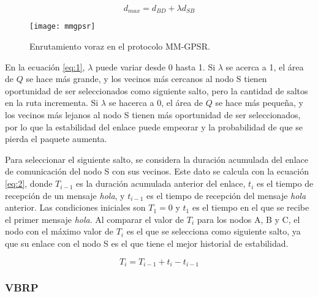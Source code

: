 \begin{equation}
\label{eq:1}
d_{max} = d_{BD} + \lambda d_{SB}
\end{equation}

\begin{figure}[th]
\centering
\texttt{[image: mmgpsr]}
\decoRule
\caption[Enrutamiento voraz en el protocolo MM-GPSR]{Enrutamiento voraz en el
protocolo MM-GPSR\protect\footnotemark.}
\label{fig:mmgpsr}
\end{figure}


En la ecuación \ref{eq:1}, $\lambda$ puede variar desde 0 hasta 1. Si $\lambda$ se
acerca a 1, el área de $Q$ se hace más grande, y los vecinos más cercanos al nodo S
tienen oportunidad de ser seleccionados como siguiente salto, pero la cantidad
de saltos en la ruta incrementa. Si $\lambda$ se hacerca a 0, el área de $Q$ se
hace más pequeña, y los vecinos más lejanos al nodo S tienen más oportunidad
de ser seleccionados, por lo que la estabilidad del enlace puede empeorar
y la probabilidad de que se pierda el paquete aumenta.

Para seleccionar el siguiente salto, se considera la duración acumulada del
enlace de comunicación del nodo S con sus vecinos. Este dato se calcula con la
ecuación \ref{eq:2}, donde $T_{i-1}$ es la duración acumulada anterior del
enlace, $t_i$ es el tiempo de recepción de un mensaje \textit{hola}, y $t_{i-1}$
es el tiempo de recepción del mensaje \textit{hola} anterior. Las condiciones
iniciales son $T_1 = 0$ y $t_1$ es el tiempo en el que se recibe el primer
mensaje \textit{hola}. Al comparar el valor de $T_i$ para los nodos A, B y C,
el nodo con el máximo valor de $T_i$ es el que se selecciona como siguiente
salto, ya que su enlace con el nodo S es el que tiene el mejor historial de
estabilidad.

\begin{equation}
\label{eq:2}
T_i = T_{i-1} + t_i - t_{i-1}
\end{equation}

\subsubsection{VBRP}
\label{subsubsec:vbpr}

